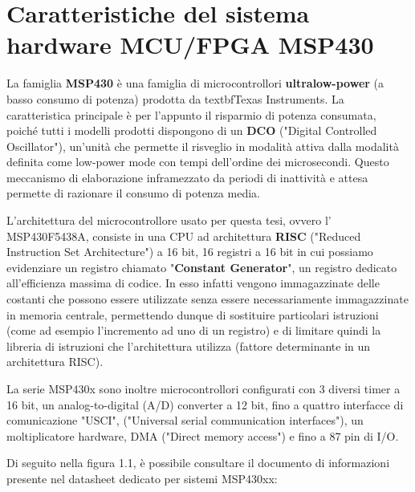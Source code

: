 \documentclass[LaM,binding=0.6cm,oneside]{../sapthesis}
\begin{document}
\section{Caratteristiche del sistema hardware MCU/FPGA MSP430}

La famiglia \textbf{MSP430} è una famiglia di microcontrollori \textbf{ultralow-power} (a basso consumo di potenza) prodotta da textbf{Texas Instruments}. 
La caratteristica principale è per l'appunto il risparmio di potenza consumata, poiché tutti i modelli prodotti dispongono di un \textbf{DCO} ("Digital Controlled Oscillator"), un'unità che permette il risveglio in modalità attiva dalla modalità definita come low-power mode con tempi dell'ordine dei microsecondi. 
Questo meccanismo di elaborazione inframezzato da periodi di inattività e attesa permette di razionare il consumo di potenza media.

L'architettura del microcontrollore usato per questa tesi, ovvero l' MSP430F5438A, consiste in una CPU ad architettura \textbf{RISC} ("Reduced Instruction Set Architecture") a 16 bit, 16 registri a 16 bit in cui possiamo evidenziare un registro chiamato "\textbf{Constant Generator}", un registro dedicato all'efficienza massima di codice. In esso infatti vengono immagazzinate delle costanti che possono essere utilizzate senza essere necessariamente immagazzinate in memoria centrale, permettendo dunque di sostituire particolari istruzioni (come ad esempio l'incremento ad uno di un registro) e di limitare quindi la libreria di istruzioni che l'architettura utilizza (fattore determinante in un architettura RISC).

La serie MSP430x sono inoltre microcontrollori configurati con 3 diversi timer a 16 bit, un analog-to-digital (A/D) converter a 12 bit, fino a quattro interfacce di comunicazione "USCI", ("Universal serial communication interfaces"), un moltiplicatore hardware, DMA ("Direct memory access") e fino a 87 pin di I/O.

Di seguito nella figura 1.1, è possibile consultare il documento di informazioni presente nel datasheet dedicato per sistemi MSP430xx:
\end{document}
